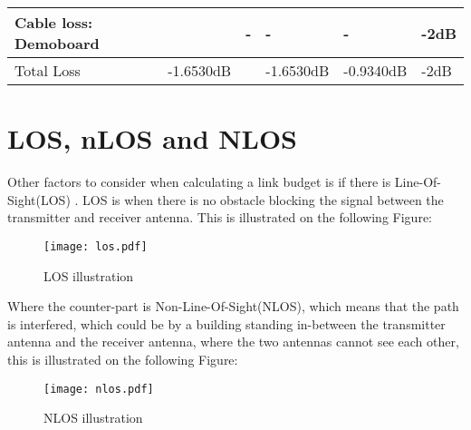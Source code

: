 \begin{table}[H]
\begin{tabular}{|l|l|l|l|l|l|}
Cable loss: Demoboard                                                       &                                                          & -                                                       & -                                                        & -                                                       & -2dB                                                          \\ \hline
Total Loss                                                                  & -1.6530dB                                                &                                                         & -1.6530dB                                                 & -0.9340dB                                              & -2dB                                                          \\ \hline
\end{tabular}
\end{table}



\section{LOS, nLOS and NLOS}

Other factors to consider when calculating a link budget is if there is Line-Of-Sight(LOS) \citep{los}. LOS is when there is no obstacle blocking the signal between the transmitter and receiver antenna. This is illustrated on the following Figure:

\begin{figure}[H]
\centering
\texttt{[image: los.pdf]}
\caption{LOS illustration}
\label{LOS}
\end{figure}  


Where the counter-part is Non-Line-Of-Sight(NLOS)\citep{los}, which means that the path is interfered, which could be by a building standing in-between the transmitter antenna and the receiver antenna, where the two antennas cannot see each other, this is illustrated on the following Figure: 

\begin{figure}[H]
\centering
\texttt{[image: nlos.pdf]}
\caption{NLOS illustration}
\label{dijdkkfkfddd}
\end{figure} 

